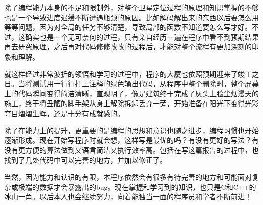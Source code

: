 \documentclass{ctexart}
\begin{document}
除了编程能力本身的不足和限制外，对整个卫星定位过程的原理和知识掌握的不够也是一个导致进度迟缓不断遭遇瓶颈的原因。比如解码解出来的东西以后要怎么用等等问题，因为对全局的任务不够清楚，导致局部的函数不知道要怎么写才好。不过，这确实也是一个无可奈何的过程，只有亲自经历一遍在程序中看不到预期结果再去研究原理，之后再对代码修修改改的过程后，才能对整个流程有更加深刻的印象和理解。

就这样经过非常波折的领悟和学习的过程中，程序的大厦也依照预期迎来了竣工之日。当将测试用一行行打上注释的绿色输出代码，从程序中整个删除时，整个屏幕上的代码瞬间变得简洁清晰，直观明了，像是建筑终于完成了灰头土脸尘烟漫天的施工，终于将丑陋的脚手架从身上解除拆卸丢弃一旁，开始准备在阳光下变得光彩夺目熠熠生辉，还是十分有成就感的。

除了在能力上的提升，更重要的是编程的思想和意识也随之进步，编程习惯也开始逐渐形成。现在开始写程序时就会想，这样写是最优的吗？有没有更好的写法？有没有更方便的算法做到又语言简洁又执行效率高。包括在写这篇报告的过程中，也找到了几处代码中可以完善的地方，并加以修正了。

当然，因为能力和认识的有限，本程序依然会有很多有待完善的地方和可能面对复杂或极端的数据才会暴露出的bug。现在掌握和学习到的知识，也只是C和C++的冰山一角。以后本人也会继续努力，向着能独当一面的程序员和学者不断前进！
\end{document}
